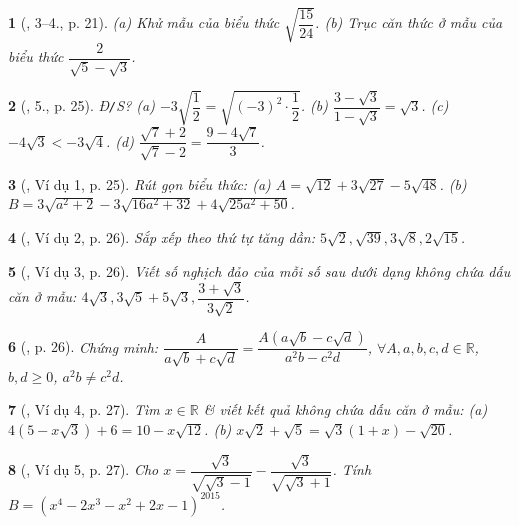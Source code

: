 \documentclass{article}
\newtheorem{baitoan}{}%
\begin{document}
\begin{baitoan}[\cite{Binh_boi_duong_Toan_9_tap_1}, 3--4., p. 21]
	(a) Khử mẫu của biểu thức $\sqrt{\dfrac{15}{24}}$. (b) Trục căn thức ở mẫu của biểu thức $\dfrac{2}{\sqrt{5} - \sqrt{3}}$.
\end{baitoan}

\begin{baitoan}[\cite{Binh_boi_duong_Toan_9_tap_1}, 5., p. 25]
	{\rm Đ{\tt/}S?} (a) $-3\sqrt{\dfrac{1}{2}} = \sqrt{(-3)^2\cdot\dfrac{1}{2}}$. (b) $\dfrac{3 - \sqrt{3}}{1 - \sqrt{3}} = \sqrt{3}$. (c) $-4\sqrt{3} < -3\sqrt{4}$. (d) $\dfrac{\sqrt{7} + 2}{\sqrt{7} - 2} = \dfrac{9 - 4\sqrt{7}}{3}$.
\end{baitoan}

\begin{baitoan}[\cite{Binh_boi_duong_Toan_9_tap_1}, Ví dụ 1, p. 25]
	Rút gọn biểu thức: (a) $A = \sqrt{12} + 3\sqrt{27} - 5\sqrt{48}$. (b) $B = 3\sqrt{a^2 + 2} - 3\sqrt{16a^2 + 32} + 4\sqrt{25a^2 + 50}$.
\end{baitoan}

\begin{baitoan}[\cite{Binh_boi_duong_Toan_9_tap_1}, Ví dụ 2, p. 26]
	Sắp xếp theo thứ tự tăng dần: $5\sqrt{2},\sqrt{39},3\sqrt{8},2\sqrt{15}$.
\end{baitoan}

\begin{baitoan}[\cite{Binh_boi_duong_Toan_9_tap_1}, Ví dụ 3, p. 26]
	Viết số nghịch đảo của mỗi số sau dưới dạng không chứa dấu căn ở mẫu: $4\sqrt{3},3\sqrt{5} + 5\sqrt{3},\dfrac{3 + \sqrt{3}}{3\sqrt{2}}$.
\end{baitoan}

\begin{baitoan}[\cite{Binh_boi_duong_Toan_9_tap_1}, p. 26]
	Chứng minh: $\dfrac{A}{a\sqrt{b} + c\sqrt{d}} = \dfrac{A(a\sqrt{b} - c\sqrt{d})}{a^2b - c^2d}$, $\forall A,a,b,c,d\in\mathbb{R}$, $b,d\ge0$, $a^2b\ne c^2d$.
\end{baitoan}

\begin{baitoan}[\cite{Binh_boi_duong_Toan_9_tap_1}, Ví dụ 4, p. 27]
	Tìm $x\in\mathbb{R}$ \& viết kết quả không chứa dấu căn ở mẫu: (a) $4(5 - x\sqrt{3}) + 6 = 10 - x\sqrt{12}$. (b) $x\sqrt{2} + \sqrt{5} = \sqrt{3}(1 + x) - \sqrt{20}$.
\end{baitoan}

\begin{baitoan}[\cite{Binh_boi_duong_Toan_9_tap_1}, Ví dụ 5, p. 27]
	Cho $x = \dfrac{\sqrt{3}}{\sqrt{\sqrt{3} - 1}} - \dfrac{\sqrt{3}}{\sqrt{\sqrt{3} + 1}}$. Tính $B = (x^4 - 2x^3 - x^2 + 2x - 1)^{2015}$.
\end{baitoan}
\end{document}
